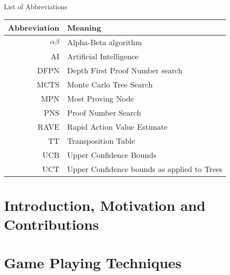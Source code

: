 \documentclass[12pt, letterpaper]{report}
\numberwithin{equation}{section}
\begin{document}
  \section*{}
  \begin{flushright}
    \huge{List of Abbreviations}
  \end{flushright}
  \vspace{0.4in}
  \begin{center}
    \begin{tabular}{rl}
      Abbreviation & Meaning \\
      \hline
      $\alpha\beta$ & Alpha-Beta algorithm \\
      AI            & Artificial Intelligence \\
      DFPN          & Depth First Proof Number search \\
      MCTS          & Monte Carlo Tree Search \\
      MPN           & Most Proving Node \\
      PNS           & Proof Number Search \\
      RAVE          & Rapid Action Value Estimate \\
      TT            & Transposition Table \\
      UCB           & Upper Confidence Bounds \\
      UCT           & Upper Confidence bounds as applied to Trees \\

    \end{tabular}
  \end{center}




  \newpage
  \setcounter{page}{1}

  \chapter[Introduction]{\label{intro} \LARGE Introduction, Motivation and Contributions}
  

  \chapter[Background]{\label{background} \LARGE Game Playing Techniques}
  
\end{document}
